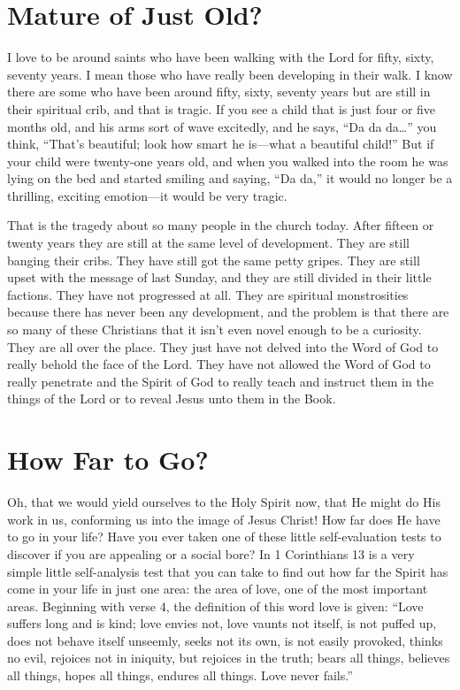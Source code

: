\section*{Mature of Just Old?}

I love to be around saints who have been walking with
the Lord for fifty, sixty, seventy years. I mean those who
have really been developing in their walk. I know there are
some who have been around fifty, sixty, seventy years but
are still in their spiritual crib, and that is tragic. If you see
a child that is just four or five months old, and his arms
sort of wave excitedly, and he says, “Da da da…” you think,
“That’s beautiful; look how smart he is—what a beautiful
child!” But if your child were twenty-one years old, and
when you walked into the room he was lying on the bed
and started smiling and saying, “Da da,” it would no longer
be a thrilling, exciting emotion—it would be very tragic.

That is the tragedy about so many people in the church
today. After fifteen or twenty years they are still at the same
level of development. They are still banging their cribs.
They have still got the same petty gripes. They are still
upset with the message of last Sunday, and they are still
divided in their little factions. They have not progressed at
all. They are spiritual monstrosities because there has never
been any development, and the problem is that there are so
many of these Christians that it isn’t even novel enough to
be a curiosity. They are all over the place. They just have not
delved into the Word of God to really behold the face of the
Lord. They have not allowed the Word of God to really penetrate
and the Spirit of God to really teach and instruct them
in the things of the Lord or to reveal Jesus unto them in the
Book.


\section*{How Far to Go?}

Oh, that we would yield ourselves to the Holy Spirit
now, that He might do His work in us, conforming us into
the image of Jesus Christ! How far does He have to go in
your life? Have you ever taken one of these little self-evaluation
tests to discover if you are appealing or a social bore?
In 1 Corinthians 13 is a very simple little self-analysis test
that you can take to find out how far the Spirit has come in
your life in just one area: the area of love, one of the most
important areas. Beginning with verse 4, the definition of
this word love is given: “Love suffers long and is kind; love
envies not, love vaunts not itself, is not puffed up, does not
behave itself unseemly, seeks not its own, is not easily provoked,
thinks no evil, rejoices not in iniquity, but rejoices
in the truth; bears all things, believes all things, hopes all
things, endures all things. Love never fails.”


